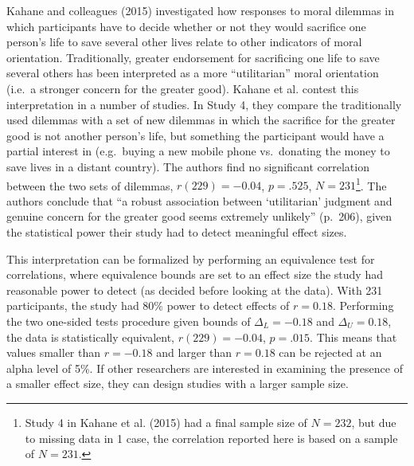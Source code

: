 \documentclass[english,floatsintext,man]{apa6}
\newcounter{author}
\theoremstyle{definition}
\theoremstyle{definition}
\theoremstyle{definition}
\theoremstyle{remark}
\begin{document}
Kahane and colleagues (2015) investigated how responses to moral
dilemmas in which participants have to decide whether or not they would
sacrifice one person's life to save several other lives relate to other
indicators of moral orientation. Traditionally, greater endorsement for
sacrificing one life to save several others has been interpreted as a
more \enquote{utilitarian} moral orientation (i.e.~a stronger concern
for the greater good). Kahane et al. contest this interpretation in a
number of studies. In Study 4, they compare the traditionally used
dilemmas with a set of new dilemmas in which the sacrifice for the
greater good is not another person's life, but something the participant
would have a partial interest in (e.g.~buying a new mobile phone
vs.~donating the money to save lives in a distant country). The authors
find no significant correlation between the two sets of dilemmas,
\(r(229) = -0.04\), \(p = .525\), \(N = 231\)\footnote{Study 4 in Kahane
  et al. (2015) had a final sample size of \(N = 232\), but due to
  missing data in 1 case, the correlation reported here is based on a
  sample of \(N = 231\).}. The authors conclude that \enquote{a robust
association between \enquote{utilitarian} judgment and genuine concern
for the greater good seems extremely unlikely} (p.~206), given the
statistical power their study had to detect meaningful effect sizes.

This interpretation can be formalized by performing an equivalence test
for correlations, where equivalence bounds are set to an effect size the
study had reasonable power to detect (as decided before looking at the
data). With 231 participants, the study had 80\% power to detect effects
of \(r = 0.18\). Performing the two one-sided tests procedure given
bounds of \(\Delta_{L} = -0.18\) and \(\Delta_{U} = 0.18\), the data is
statistically equivalent, \(r(229) = -0.04\), \(p = .015\). This means
that values smaller than \(r = -0.18\) and larger than \(r = 0.18\) can
be rejected at an alpha level of 5\%. If other researchers are
interested in examining the presence of a smaller effect size, they can
design studies with a larger sample size.
\end{document}
